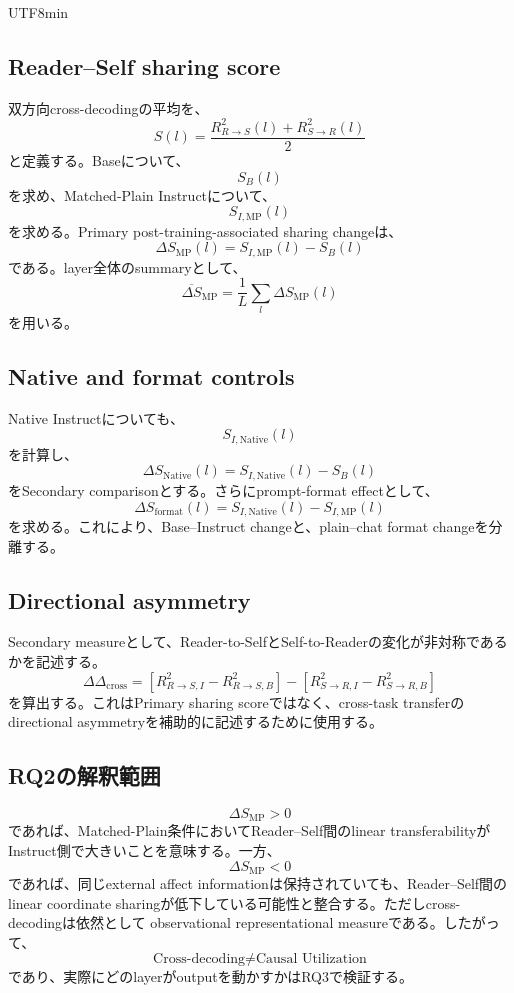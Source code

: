 \documentclass{article} %
\begin{document}
\begin{CJK*}{UTF8}{min}
\subsection{Reader--Self sharing score}

双方向cross-decodingの平均を、
\[
S(l)
=
\frac{
R^2_{R\rightarrow S}(l)
+
R^2_{S\rightarrow R}(l)
}{2}
\]
と定義する。Baseについて、
\[
S_B(l)
\]
を求め、Matched-Plain Instructについて、
\[
S_{I,\mathrm{MP}}(l)
\]
を求める。Primary post-training-associated sharing changeは、
\[
\Delta S_{\mathrm{MP}}(l)
=
S_{I,\mathrm{MP}}(l)
-
S_B(l)
\]
である。layer全体のsummaryとして、
\[
\overline{\Delta S}_{\mathrm{MP}}
=
\frac{1}{L}
\sum_l
\Delta S_{\mathrm{MP}}(l)
\]
を用いる。


\subsection{Native and format controls}

Native Instructについても、
\[
S_{I,\mathrm{Native}}(l)
\]
を計算し、
\[
\Delta S_{\mathrm{Native}}(l)
=
S_{I,\mathrm{Native}}(l)
-
S_B(l)
\]
をSecondary comparisonとする。さらにprompt-format effectとして、
\[
\Delta S_{\mathrm{format}}(l)
=
S_{I,\mathrm{Native}}(l)
-
S_{I,\mathrm{MP}}(l)
\]
を求める。これにより、Base--Instruct changeと、plain--chat format changeを分離する。


\subsection{Directional asymmetry}

Secondary measureとして、Reader-to-SelfとSelf-to-Readerの変化が非対称であるかを記述する。
\[
\Delta\Delta_{\mathrm{cross}}
=
[
R^2_{R\rightarrow S,I}
-
R^2_{R\rightarrow S,B}
]
-
[
R^2_{S\rightarrow R,I}
-
R^2_{S\rightarrow R,B}
]
\]
を算出する。これはPrimary sharing scoreではなく、cross-task transferのdirectional asymmetryを補助的に記述するために使用する。


\subsection{RQ2の解釈範囲}

\[
\Delta S_{\mathrm{MP}}>0
\]
であれば、Matched-Plain条件においてReader--Self間のlinear transferabilityがInstruct側で大きいことを意味する。一方、
\[
\Delta S_{\mathrm{MP}}<0
\]
であれば、同じexternal affect informationは保持されていても、Reader--Self間のlinear coordinate sharingが低下している可能性と整合する。ただしcross-decodingは依然として
observational representational measureである。したがって、
\[
\text{Cross-decoding}
\neq
\text{Causal Utilization}
\]
であり、実際にどのlayerがoutputを動かすかはRQ3で検証する。



\end{CJK*}
\end{document}
